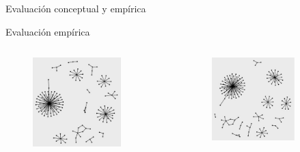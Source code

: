 \begin{frame}{Evaluación conceptual y empírica}
\begin{block}{Evaluación empírica}
\begin{minipage}[t][.40\textheight][t]{\textwidth}
    \begin{columns}
    \begin{column}{0.3\textwidth}
    \tiny
    \begin{figure}[H]
        \begin{center}
             \includegraphics[width=0.8\textwidth]{images/C2/2009/sinfiltro.jpg}
         \end{center}
    \end{figure}
    \end{column}
    \begin{column}{0.3\textwidth}  
    \tiny
    \begin{figure}[H]
        \begin{center}
         \includegraphics[width=0.75\textwidth]{images/C2/2009/filtradaa.jpg}

\end{center}
\end{figure}
\end{column}
\end{columns}
\end{minipage}
\end{block}
\end{frame}
